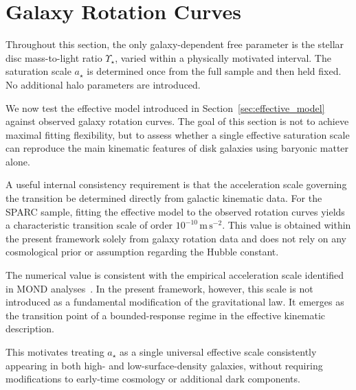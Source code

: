 \section{Galaxy Rotation Curves}
  \label{sec:rotation_curves}

  Throughout this section, the only galaxy-dependent free parameter
  is the stellar disc mass-to-light ratio $\Upsilon_\star$,
  varied within a physically motivated interval.
  The saturation scale $a_\star$ is determined once from the full sample
  and then held fixed.
  No additional halo parameters are introduced.

  We now test the effective model introduced in
  Section~\ref{sec:effective_model} against observed galaxy rotation curves.
  The goal of this section is not to achieve maximal fitting flexibility, but to
  assess whether a single effective saturation scale can reproduce the main
  kinematic features of disk galaxies using baryonic matter alone.

  A useful internal consistency requirement is that the acceleration scale
  governing the transition be determined directly from galactic kinematic data.
  For the SPARC sample, fitting the effective model to the observed rotation
  curves yields a characteristic transition scale of order
  $10^{-10}\,\mathrm{m\,s^{-2}}$.
  This value is obtained within the present framework solely from galaxy
  rotation data and does not rely on any cosmological prior or assumption
  regarding the Hubble constant.

  The numerical value is consistent with the empirical acceleration scale
  identified in MOND analyses~\cite{McGaugh2016}.
  In the present framework, however, this scale is not introduced as a
  fundamental modification of the gravitational law.
  It emerges as the transition point of a bounded-response regime in
  the effective kinematic description.

  This motivates treating $a_\star$ as a single universal effective scale
  consistently appearing in both high- and low-surface-density galaxies,
  without requiring modifications to early-time cosmology or additional
  dark components.

  
  
  
  
  
  
